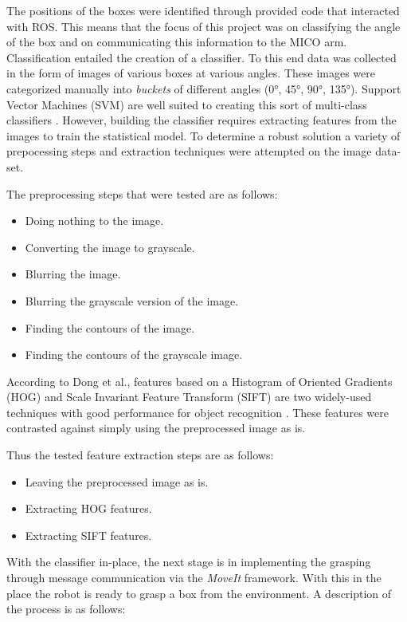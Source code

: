 \documentclass[letterpaper, 10 pt, conference]{conf/ieeeconf}  %
\begin{document}
The positions of the boxes were identified through provided code that interacted
with ROS. This means that the focus of this project was on classifying the angle
of the box and on communicating this information to the MICO arm. Classification
entailed the creation of a classifier. To this end data was collected in the
form of images of various boxes at various angles. These images were categorized
manually into \textit{buckets} of different angles (\ang{0}, \ang{45}, \ang{90},
\ang{135}). Support Vector Machines (SVM) are well suited to creating this sort
of multi-class classifiers \cite{Hsu2015}. However, building the classifier
requires extracting features from the images to train the statistical model. To
determine a robust solution a variety of prepocessing steps and extraction
techniques were attempted on the image data-set.

The preprocessing steps that were tested are as follows:
\begin{itemize}
\item Doing nothing to the image.
\item Converting the image to grayscale.
\item Blurring the image.
\item Blurring the grayscale version of the image.
\item Finding the contours of the image.
\item Finding the contours of the grayscale image.
\end{itemize}

According to Dong et al., features based on a Histogram of Oriented Gradients
(HOG) and Scale Invariant Feature Transform (SIFT) are two widely-used
techniques with good performance for object recognition \cite{Dong2010}. These
features were contrasted against simply using the preprocessed image as is.

Thus the tested feature extraction steps are as follows:
\begin{itemize}
\item Leaving the preprocessed image as is.
\item Extracting HOG features.
\item Extracting SIFT features.
\end{itemize}


With the classifier in-place, the next stage is in implementing the grasping through message communication via the \textit{MoveIt} framework. With this in the place the robot is ready to grasp a box from the environment. A description of the process is as follows:
\end{document}
